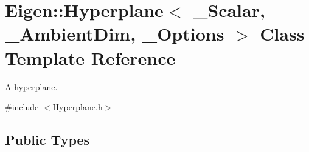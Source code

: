 \hypertarget{class_eigen_1_1_hyperplane}{}\section{Eigen\+::Hyperplane$<$ \+\_\+\+Scalar, \+\_\+\+Ambient\+Dim, \+\_\+\+Options $>$ Class Template Reference}
\label{class_eigen_1_1_hyperplane}


A hyperplane.  




{\ttfamily \#include $<$Hyperplane.\+h$>$}

\subsection*{Public Types}
